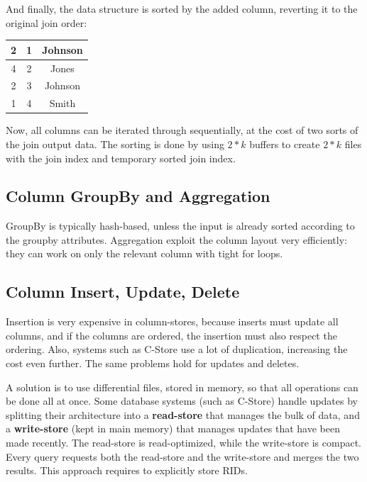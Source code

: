 \noindent And finally, the data structure is sorted by the added column, reverting it to the original join order:
\begin{table}[H]
    \centering
    \begin{tabular}{|c||c|c|}
    \hline
        2 & 1 & Johnson \\
    \hline
        4 & 2 & Jones \\
    \hline
        2 & 3 & Johnson \\
    \hline
        1 & 4 & Smith \\
    \hline
    \end{tabular}
\end{table}
\noindent Now, all columns can be iterated through sequentially, at the cost of two sorts of the join output data. The sorting is done by using $2*k$ buffers to create $2*k$ files with the join index and temporary sorted join index.

\subsection{Column GroupBy and Aggregation}

GroupBy is typically hash-based, unless the input is already sorted according to the groupby attributes. Aggregation exploit the column layout very efficiently: they can work on only the relevant column with tight for loops.

\subsection{Column Insert, Update, Delete}

Insertion is very expensive in column-stores, because inserts must update all columns, and if the columns are ordered, the insertion must also respect the ordering. Also, systems such as C-Store use a lot of duplication, increasing the cost even further. The same problems hold for updates and deletes.

A solution is to use differential files, stored in memory, so that all operations can be done all at once. Some database systems (such as C-Store) handle updates by splitting their architecture into a \textbf{read-store} that manages the bulk of data, and a \textbf{write-store} (kept in main memory) that manages updates that have been made recently. The read-store is read-optimized, while the write-store is compact. Every query requests both the read-store and the write-store and merges the two results. This approach requires to explicitly store RIDs.

